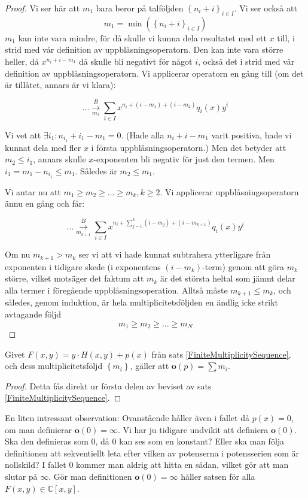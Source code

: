 \begin{proof}
Vi ser här att $m_1$ bara beror på talföljden $\left\{n_i+i\right\}_{i\in I}$. Vi ser också att
\[m_1=\min(\left\{n_i+i\right\}_{i\in I})\]
$m_1$ kan inte vara mindre, för då skulle vi kunna dela resultatet med ett $x$ till, i strid med vår definition av uppblåsningsoperatorn. Den kan inte vara större heller, då $x^{n_i+i-m_1}$ då skulle bli negativt för något $i$, också det i strid med vår definition av uppblåsningsoperatorn. Vi applicerar operatorn en gång till (om det är tillåtet, annars är vi klara):

\[\ldots \overset{B}{\underset{m_2}{\longrightarrow}} \sum_{i\in I} x^{n_i+(i-m_1)+(i-m_2)}q_i(x)y^i\]

Vi vet att $\exists i_1:n_{i_1}+i_1-m_1=0$. (Hade alla $n_i+i-m_1$ varit positiva, hade vi kunnat dela med fler $x$ i första uppblåsningsoperatorn.) Men det betyder att $m_2\leq i_1$, annars skulle $x$-exponenten bli negativ för just den termen. Men $i_1=m_1-n_{i_1}\leq m_1$. Således är $m_2\leq m_1$.

Vi antar nu att $m_1\geq m_2 \geq \ldots \geq m_k, k \geq 2$. Vi applicerar uppblåsnings\-operatorn ännu en gång och får:

\[\ldots \overset{B}{\underset{m_{k+1}}{\longrightarrow}} \sum_{i\in I} x^{n_i+\sum_{j=1}^{k} (i-m_j) + (i-m_{k+1})}q_i(x)y^i\]

Om nu $m_{k+1}>m_k$ ser vi att vi hade kunnat subtrahera ytterligare från exponenten i tidigare skede (i exponentens $(i-m_k)$-term) genom att göra $m_k$ större, vilket motsäger det faktum att $m_k$ är det största heltal som jämnt delar alla termer i föregående uppblåsningsoperation. Alltså måste $m_{k+1}\leq m_k$, och således, genom induktion, är hela multiplicitetsföljden en ändlig icke strikt avtagande följd
\[m_1 \geq m_2 \geq \ldots \geq m_N\]
\end{proof}

\begin{Corollary}
\label{OrderP}
Givet $F(x,y)=y\cdot H(x,y)+p(x)$ från sats \ref{FiniteMultiplicitySequence}, och dess multiplicitetsföljd $\left\{m_i\right\}$, gäller att $\mathbf{o}(p)=\sum m_i$.
\end{Corollary}

\begin{proof}
Detta fås direkt ur första delen av beviset av sats \ref{FiniteMultiplicitySequence}.
\end{proof}

En liten intressant observation: Ovanstående håller även i fallet då $p(x)=0$, om man definierar $\mathbf{o}(0)=\infty$. Vi har ju tidigare undvikit att definiera $\mathbf{o}(0)$. Ska den definieras som 0, då 0 kan ses som en konstant? Eller ska man följa definitionen att sekventiellt leta efter vilken av potenserna i potensserien som är nollskild? I fallet 0 kommer man aldrig att hitta en sådan, vilket gör att man slutar på $\infty$. Gör man definitionen $\mathbf{o}(0)=\infty$ håller satsen för alla $F(x,y)\in \mathbb{C}[x,y]$.

